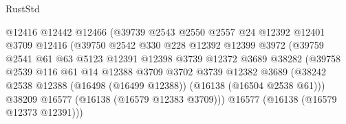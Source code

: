 \begin{lexlean}{RustStd}
\begin{coremodule}
                                      @12416
                                      @12442
                                      @12466
                                      (@39739
                                        @2543
                                        @2550
                                        @2557
                                        @24
                                        @12392
                                        @12401
                                        @3709
                                        @12416
                                        (@39750
                                          @2542
                                          @330
                                          @228
                                          @12392
                                          @12399
                                          @3972
                                          (@39759
                                            @2541
                                            @61
                                            @63
                                            @5123
                                            @12391
                                            @12398
                                            @3739
                                            @12372
                                            @3689
                                            @38282
                                            (@39758
                                              @2539
                                              @116
                                              @61
                                              @14
                                              @12388
                                              @3709
                                              @3702
                                              @3739
                                              @12382
                                              @3689
                                              (@38242
                                                @2538
                                                @12388
                                                (@16498 (@16499 @12388))
                                                (@16138 (@16504 @2538 @61)))
                                              @38209
                                              @16577
                                              (@16138 (@16579 @12383 @3709)))
                                            @16577
                                            (@16138 (@16579 @12373 @12391)))

\end{coremodule}
\end{lexlean}
